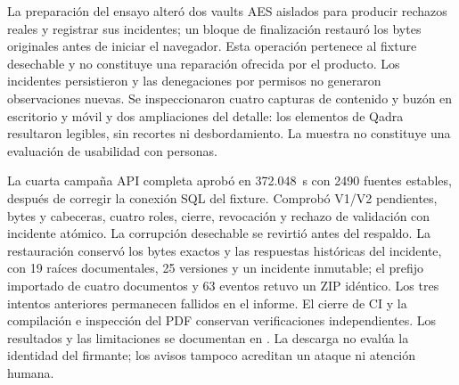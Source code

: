 La preparación del ensayo alteró dos vaults AES aislados para producir rechazos reales y registrar sus incidentes; un bloque de finalización restauró los bytes originales antes de iniciar el navegador. Esta operación pertenece al fixture desechable y no constituye una reparación ofrecida por el producto. Los incidentes persistieron y las denegaciones por permisos no generaron observaciones nuevas. Se inspeccionaron cuatro capturas de contenido y buzón en escritorio y móvil y dos ampliaciones del detalle: los elementos de Qadra resultaron legibles, sin recortes ni desbordamiento. La muestra no constituye una evaluación de usabilidad con personas.

La cuarta campaña API completa aprobó en 372.048~s con 2490 fuentes estables, después de corregir la conexión SQL del fixture. Comprobó V1/V2 pendientes, bytes y cabeceras, cuatro roles, cierre, revocación y rechazo de validación con incidente atómico. La corrupción desechable se revirtió antes del respaldo. La restauración conservó los bytes exactos y las respuestas históricas del incidente, con 19 raíces documentales, 25 versiones y un incidente inmutable; el prefijo importado de cuatro documentos y 63 eventos retuvo un ZIP idéntico. Los tres intentos anteriores permanecen fallidos en el informe. El cierre de CI y la compilación e inspección del PDF conservan verificaciones independientes. Los resultados y las limitaciones se documentan en . La descarga no evalúa la identidad del firmante; los avisos tampoco acreditan un ataque ni atención humana.
